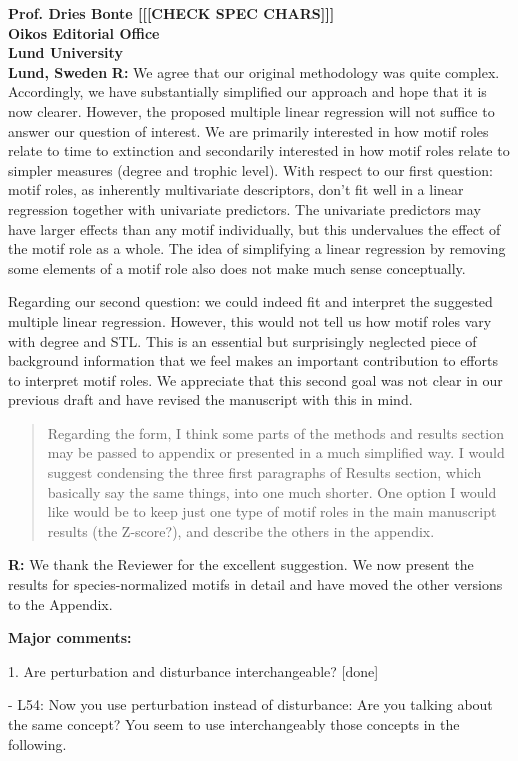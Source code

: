 \documentclass[12pt]{letter}
\begin{document}
\begin{letter}{\bf Prof. Dries Bonte [[[CHECK SPEC CHARS]]]\\
Oikos Editorial Office \\
Lund University \\
Lund, Sweden}
  \textbf{R:} We agree that our original methodology was quite complex. 
  Accordingly, we have substantially simplified our approach and hope that it is now clearer.
  However, the proposed multiple linear regression will not suffice to answer our question of interest. We are primarily interested in how motif roles relate to time to extinction and secondarily interested in how motif roles relate to simpler measures (degree and trophic level). With respect to our first question: motif roles, as inherently multivariate descriptors, don't fit well in a linear regression together with univariate predictors. The univariate predictors may have larger effects than any motif individually, but this undervalues the effect of the motif role as a whole. The idea of simplifying a linear regression by removing some elements of a motif role also does not make much sense conceptually.


  Regarding our second question: we could indeed fit and interpret the suggested multiple linear regression. However, this would not tell us how motif roles vary with degree and STL. This is an essential but surprisingly neglected piece of background information that we feel makes an important contribution to efforts to interpret motif roles.
  We appreciate that this second goal was not clear in our previous draft and have revised the manuscript with this in mind.


  \begin{quotation}
  Regarding the form, I think some parts of the methods and results section may be passed to appendix or presented in a much simplified way. I would suggest condensing the three first paragraphs of Results section, which basically say the same things, into one much shorter. One option I would like would be to keep just one type of motif roles in the main manuscript results (the Z-score?), and describe the others in the appendix.
  \end{quotation}


  \textbf{R:}  We thank the Reviewer for the excellent suggestion. We now present the results for species-normalized motifs in detail and have moved the other versions to the Appendix.


  \textbf{Major comments:}

    1. Are perturbation and disturbance interchangeable? [done]

      - L54: Now you use perturbation instead of disturbance: Are you talking about the same concept? You seem to use interchangeably those concepts in the following.


\end{letter}
\end{document}
